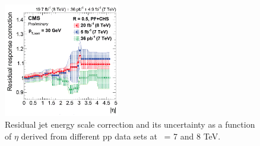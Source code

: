 \begin{figure}[h]
\begin{center}
\includegraphics[width= 0.45\textwidth]{figures/staterror_jec_luminosity_pp.png}
\caption{Residual jet energy scale correction and its uncertainty as a function of
$\eta$ derived from different pp data sets at \roots\ = 7 and 8 TeV.}
\label{fig:jetJES}
\end{center}
\end{figure}

\clearpage